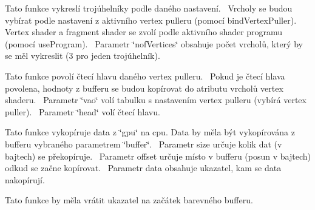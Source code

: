\begin{DoxyRefList}
\item[\label{todo__todo000036}%
\Hypertarget{todo__todo000036}%
Global \hyperlink{group__draw__tasks_ga127436afbcbda852746dfb9dae885ecf}{G\+PU\+:\+:draw\+Triangles} (uint32\+\_\+t nof\+Vertices)]Tato funkce vykreslí trojúhelníky podle daného nastavení.~\newline
 Vrcholy se budou vybírat podle nastavení z aktivního vertex pulleru (pomocí bind\+Vertex\+Puller).~\newline
 Vertex shader a fragment shader se zvolí podle aktivního shader programu (pomocí use\+Program).~\newline
 Parametr \char`\"{}nof\+Vertices\char`\"{} obsahuje počet vrcholů, který by se měl vykreslit (3 pro jeden trojúhelník).~\newline
  
\item[\label{todo__todo000012}%
\Hypertarget{todo__todo000012}%
Global \hyperlink{group__vertexpuller__tasks_ga61384d99754bda4d91790c49b1639b30}{G\+PU\+:\+:enable\+Vertex\+Puller\+Head} (Vertex\+Puller\+ID vao, uint32\+\_\+t head)]Tato funkce povolí čtecí hlavu daného vertex pulleru.~\newline
 Pokud je čtecí hlava povolena, hodnoty z bufferu se budou kopírovat do atributu vrcholů vertex shaderu.~\newline
 Parametr \char`\"{}vao\char`\"{} volí tabulku s nastavením vertex pulleru (vybírá vertex puller).~\newline
 Parametr \char`\"{}head\char`\"{} volí čtecí hlavu.~\newline
  
\item[\label{todo__todo000006}%
\Hypertarget{todo__todo000006}%
Global \hyperlink{group__buffer__tasks_ga7b89dbe4afbfec3725c64000b37445af}{G\+PU\+:\+:get\+Buffer\+Data} (Buffer\+ID buffer, uint64\+\_\+t offset, uint64\+\_\+t size, void $\ast$data)]Tato funkce vykopíruje data z \char`\"{}gpu\char`\"{} na cpu. Data by měla být vykopírována z bufferu vybraného parametrem \char`\"{}buffer\char`\"{}.~\newline
 Parametr size určuje kolik dat (v bajtech) se překopíruje.~\newline
 Parametr offset určuje místo v bufferu (posun v bajtech) odkud se začne kopírovat.~\newline
 Parametr data obsahuje ukazatel, kam se data nakopírují.~\newline
  
\item[\label{todo__todo000031}%
\Hypertarget{todo__todo000031}%
Global \hyperlink{group__framebuffer__tasks_ga67504b8136ef6283ad6efbb5323a0ef8}{G\+PU\+:\+:get\+Framebuffer\+Color} ()]Tato funkce by měla vrátit ukazatel na začátek barevného bufferu.~\newline
  

\end{DoxyRefList}

